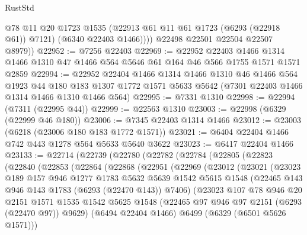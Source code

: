 \begin{lexlean}{RustStd}
\begin{coremodule}
{{              @78
              @11
              @20
              @1723
              @1535
              (@22913 @61 @11 @61 @1723 (@6293 (@22918 @61)) @7121)
              (@6340 @22403 @1466))))
        @22498
        @22501
        @22504
        @22507
        @8979))
@22952 := @7256 @22403
@22969 := @22952
    @22403
    @1466
    @1314
    @1466
    @1310
    @47
    @1466
    @564
    @5646
    @61
    @164
    @46
    @566
    @1755
    @1571
    @1571
    @2859
@22994 := @22952
    @22404
    @1466
    @1314
    @1466
    @1310
    @46
    @1466
    @564
    @1923
    @44
    @180
    @183
    @1307
    @1772
    @1571
    @5633
    @5642
    (@7301 @22403 @1466 @1314 @1466 @1310 @1466 @564)
@22995 := @7331 @1310
@22998 := @22994 (@7311 (@22995 @44))
@22999 := @22563 @1310
@23003 := @22998 (@6329 (@22999 @46 @180))
@23006 := @7345 @22403 @1314 @1466
@23012 := @23003 (@6218 (@23006 @180 @183 @1772 @1571))
@23021 := @6404 @22404 @1466 @742 @443 @1278 @564 @5633 @5640 @3622
@23023 := @6417 @22404 @1466
@23133 := @22714
    (@22739
      (@22780
        (@22782
          (@22784
            (@22805
              (@22823
                (@22840
                  (@22853
                    (@22864
                      (@22868
                        (@22951
                          (@22969
                            (@23012
                              (@23021
                                (@23023
                                  @189
                                  @157
                                  @946
                                  @1277
                                  @1783
                                  @5632
                                  @5639
                                  @1542
                                  @5615
                                  @1548
                                  (@22465 @143 @946 @143 @1783 (@6293 (@22470 @143)) @7406)
                                  (@23023
                                    @107
                                    @78
                                    @946
                                    @20
                                    @2151
                                    @1571
                                    @1535
                                    @1542
                                    @5625
                                    @1548
                                    (@22465 @97 @946 @97 @2151 (@6293 (@22470 @97)) @9629)
                                    (@6494 @22404 @1466)
                                    @6499
                                    (@6329 (@6501 @5626 @1571)))
}}
\end{coremodule}
\end{lexlean}
